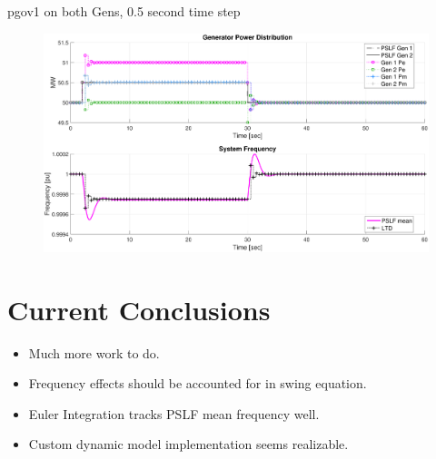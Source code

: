 \documentclass[14pt, unknownkeysallowed]{beamer}
\begin{document}
\begin{frame}
pgov1 on both Gens, 0.5 second time step
\begin{figure}
	\includegraphics[width=\linewidth]{pgov1Bh}
\end{figure}
\end{frame}

\section{Current Conclusions}
\begin{frame}
\begin{itemize}
	\item Much more work to do.
	\item Frequency effects should be accounted for in swing equation.
	\item Euler Integration tracks PSLF mean frequency well.
	\item Custom dynamic model implementation seems realizable. 
\end{itemize}
\end{frame}

\end{document}
